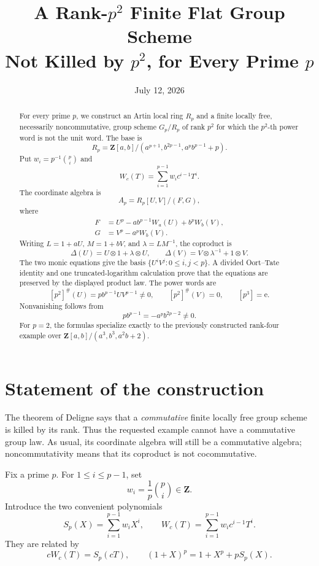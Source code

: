 \documentclass[11pt]{amsart}
\title[A rank-\(p^2\) counterexample for every prime]
      {A Rank-\(p^2\) Finite Flat Group Scheme\\
       Not Killed by \(p^2\), for Every Prime \(p\)}
\author{}
\date{July 12, 2026}
\theoremstyle{definition}
\theoremstyle{remark}
\newcommand{\Z}{\mathbf Z}
\newcommand{\ot}{\otimes}
\newcommand{\unit}{\mathrm e}
\begin{document}
\begin{abstract}
For every prime \(p\), we construct an Artin local ring \(R_p\) and a
finite locally free, necessarily noncommutative, group scheme \(G_p/R_p\)
of rank \(p^2\) for which the \(p^2\)-th power word is not the unit word.
The base is
\[
 R_p=\Z[a,b]/(a^{p+1},b^{2p-1},a^pb^{p-1}+p).
\]
Put \(w_i=p^{-1}\binom pi\) and
\[
 W_c(T)=\sum_{i=1}^{p-1}w_i c^{i-1}T^i.
\]
The coordinate algebra is
\[
 A_p=R_p[U,V]/(F,G),
\]
where
\[
 \begin{split}
 F&=U^p-a b^{p-1}W_a(U)+b^pW_b(V),\\
 G&=V^p-a^pW_b(V).
 \end{split}
\]
Writing \(L=1+aU\), \(M=1+bV\), and
\(\lambda=LM^{-1}\), the coproduct is
\[
 \Delta(U)=U\ot1+\lambda\ot U,
 \qquad
 \Delta(V)=V\ot\lambda^{-1}+1\ot V.
\]
The two monic equations give the basis
\(\{U^iV^j:0\leq i,j<p\}\).  A divided Oort--Tate identity and one
truncated-logarithm calculation prove that the equations are preserved
by the displayed product law.  The power words are
\[
 [p^2]^\#(U)=p b^{p-1}UV^{p-1}\ne0,
 \qquad [p^2]^\#(V)=0,
 \qquad [p^3]=\unit.
\]
Nonvanishing follows from
\[
 p b^{p-1}=-a^pb^{2p-2}\ne0.
\]
For \(p=2\), the formulas specialize exactly to the previously
constructed rank-four example over
\(\Z[a,b]/(a^3,b^3,a^2b+2)\).
\end{abstract}

\maketitle
\tableofcontents

\section{Statement of the construction}

The theorem of Deligne says that a \emph{commutative} finite locally
free group scheme is killed by its rank.  Thus the requested example
cannot have a commutative group law.  As usual, its coordinate algebra
will still be a commutative algebra; noncommutativity means that its
coproduct is not cocommutative.

Fix a prime \(p\).  For \(1\leq i\leq p-1\), set
\begin{equation}\label{eq:wi}
 w_i=\frac1p\binom pi\in\Z.
\end{equation}
Introduce the two convenient polynomials
\begin{equation}\label{eq:S-W}
 S_p(X)=\sum_{i=1}^{p-1}w_iX^i,
 \qquad
 W_c(T)=\sum_{i=1}^{p-1}w_i c^{i-1}T^i.
\end{equation}
They are related by
\begin{equation}\label{eq:cW=S}
 cW_c(T)=S_p(cT),
 \qquad
 (1+X)^p=1+X^p+pS_p(X).
\end{equation}
\end{document}
